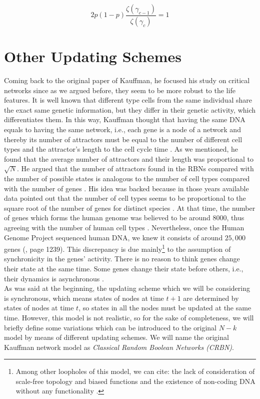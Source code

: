 \begin{equation}
2p(1-p) \frac{\zeta (\gamma_{c -1})}{\zeta (\gamma_{c})}=1
\end{equation}

\section{Other Updating Schemes}
Coming back to the original paper of Kauffman, he focused his study on critical networks since as we argued before, they seem to be more robust to the life features. It is well known that different type cells from the same individual share the exact same genetic information, but they differ in their genetic activity, which differentiates them. In this way, Kauffman thought that having the same DNA equals to having the same network, i.e., each gene is a node of a network and thereby its number of attractors must be equal to the number of different cell types and the attractor's length to the cell cycle time \cite{rbn_barbara}. As we mentioned, he found that the average number of attractors and their length was proportional to $\sqrt{N}$. He argued that the number of attractors found in the RBNs compared with the number of possible states is analogous to the number of cell types compared with the number of genes \cite{rbn_carlos}. His idea was backed because in those years available data pointed out that the number of cell types seems to be proportional to the square root of the number of genes for distinct species \cite{rbn_barbara}. At that time, the number of genes which forms the human genome was believed to be around $8000$, thus agreeing with the number of human cell types \cite{rbn_carlos}. Nevertheless, once the Human Genome Project sequenced human DNA, we knew it consists of around $25,000$ genes (\cite{human_genome}, page 1239). This discrepancy is due mainly\footnote{Among other loopholes of this model, we can cite: the lack of consideration of scale-free topology and biased functions and the existence of non-coding DNA without any functionality \cite{rbn_carlos}.} to the assumption of synchronicity in the genes' activity. There is no reason to think genes change their state at the same time. Some genes change their state before others, i.e., their dynamics is asynchronous \cite{rbn_carlos}.\\

As was said at the beginning, the updating scheme which we will be considering is synchronous, which means states of nodes at time $t+1$ are determined by states of nodes at time $t$, so states in all the nodes must be updated at the same time. However, this model is not realistic, so for the sake of completeness, we will briefly define some variations which can be introduced to the original $N-k$ model by means of different updating schemes. We will name the original Kauffman network model as \textit{Classical Random Boolean Networks (CRBN)}.

